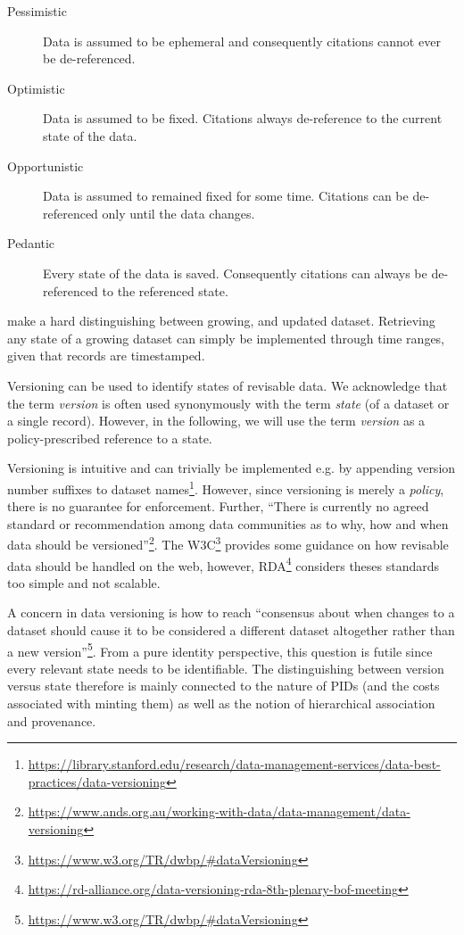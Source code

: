 \documentclass[letterpaper, twocolumn, parskip=half, fontsize=8pt, DIV=calc]{scrartcl}
\begin{document}
\begin{description}
  \item[Pessimistic] Data is assumed to be ephemeral and consequently citations cannot ever be de-referenced.
  \item[Optimistic] Data is assumed to be fixed. Citations always de-reference to the current state of the data.
  \item[Opportunistic] Data is assumed to remained fixed for some time. Citations can be de-referenced only until the data changes.
  \item[Pedantic] Every state of the data is saved. Consequently citations can always be de-referenced to the referenced state.  
\end{description}

\cite{Klump2016} make a hard distinguishing between growing, and updated dataset. Retrieving any state of a growing dataset can simply be implemented through time ranges, given that records are timestamped. 

Versioning can be used to identify states of revisable data. We acknowledge that the term \textit{version} is often used synonymously with the term  \textit{state} (of a dataset or a single record). However, in the following, we will use the term \textit{version} as a policy-prescribed reference to a state.

Versioning is intuitive and can trivially be implemented e.g. by appending version number suffixes to dataset names\footnote{\url{https://library.stanford.edu/research/data-management-services/data-best-practices/data-versioning}}. 
However, since versioning is merely a \textit{policy}, there is no guarantee for enforcement. Further, ``There is currently no agreed standard or recommendation among data communities as to why, how and when data should be versioned''\footnote{\url{https://www.ands.org.au/working-with-data/data-management/data-versioning}}.
The W3C\footnote{\url{https://www.w3.org/TR/dwbp/\#dataVersioning}} provides some guidance on how revisable data should be handled on the web, however, \gls{RDA}\footnote{\url{https://rd-alliance.org/data-versioning-rda-8th-plenary-bof-meeting}} considers theses standards too simple and not scalable.

A concern in data versioning is how to reach ``consensus about when changes to a dataset should cause it to be considered a different dataset altogether rather than a new version''\footnote{\url{https://www.w3.org/TR/dwbp/\#dataVersioning}}.
From a pure identity perspective, this question is futile since every relevant state needs to be identifiable. The distinguishing between version versus state therefore is mainly connected to the nature of \glspl{PID} (and the costs associated with minting them) \citep{Klump2016} as well as the notion of hierarchical association and provenance. 
\end{document}
